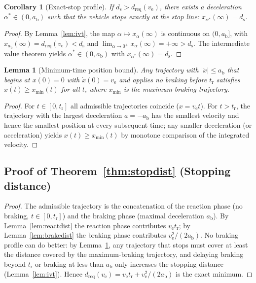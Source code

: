 \documentclass[conference, a4paper]{IEEEtran}
\theoremstyle{plain}
\newtheorem{lemma}[theorem]{Lemma}
\newtheorem{corollary}[theorem]{Corollary}
\newcommand{\dreq}{d_{\mathrm{req}}}
\newcommand{\ds}{d_{\mathrm{s}}}
\newcommand{\ab}{a_{\mathrm{b}}}
\newcommand{\tr}{t_{\mathrm{r}}}
\newcommand{\ve}{v_{\mathrm{e}}}
\begin{document}
\begin{corollary}[Exact-stop profile]
\label{cor:exactstop}
If $\ds > \dreq(\ve)$, there exists a deceleration $\alpha^* \in (0,\ab)$
such that the vehicle stops exactly at the stop line:
$x_{\alpha^*}(\infty) = \ds$.
\end{corollary}

\begin{proof}
By Lemma~\ref{lem:ivt}, the map $\alpha \mapsto x_\alpha(\infty)$ is
continuous on $(0,\ab]$, with $x_{\ab}(\infty) = \dreq(\ve) < \ds$ and
$\lim_{\alpha \to 0^+} x_\alpha(\infty) = +\infty > \ds$. The intermediate
value theorem yields $\alpha^* \in (0, \ab)$ with
$x_{\alpha^*}(\infty) = \ds$.
\end{proof}

\begin{lemma}[Minimum-time position bound]
\label{lem:minpos}
Any trajectory with $|\ddot{x}| \leq \ab$ that begins at $x(0)=0$ with
$\dot{x}(0) = \ve$ and applies no braking before $\tr$ satisfies
$x(t) \geq x_{\min}(t)$ for all $t$, where $x_{\min}$ is the
maximum-braking trajectory.
\end{lemma}

\begin{proof}
For $t \in [0,\tr]$ all admissible trajectories coincide ($x = \ve t$). For
$t > \tr$, the trajectory with the largest deceleration $a = -\ab$ has the
smallest velocity and hence the smallest position at every subsequent time;
any smaller deceleration (or acceleration) yields $x(t) \geq x_{\min}(t)$ by
monotone comparison of the integrated velocity.
\end{proof}

\subsection{Proof of Theorem~\ref{thm:stopdist} (Stopping distance)}

\begin{proof}
The admissible trajectory is the concatenation of the reaction phase
(no braking, $t \in [0,\tr]$) and the braking phase (maximal deceleration
$\ab$). By Lemma~\ref{lem:reactdist} the reaction phase contributes
$\ve \tr$; by Lemma~\ref{lem:brakedist} the braking phase contributes
$\ve^2/(2\ab)$. No braking profile can do better: by
Lemma~\ref{lem:minpos}, any trajectory that stops must cover at least the
distance covered by the maximum-braking trajectory, and delaying braking
beyond $\tr$ or braking at less than $\ab$ only increases the stopping
distance (Lemma~\ref{lem:ivt}). Hence $\dreq(\ve) = \ve\tr + \ve^2/(2\ab)$
is the exact minimum.
\end{proof}
\end{document}
